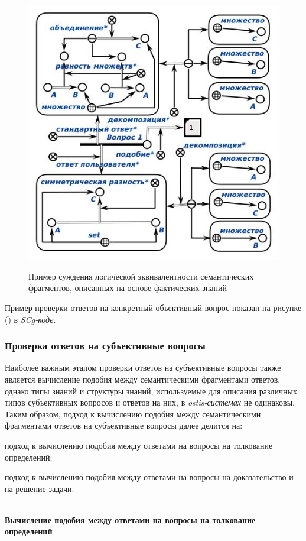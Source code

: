 \begin{figure}[H]
	\caption{Пример суждения логической эквивалентности семантических фрагментов, описанных на основе фактических знаний}
	\includegraphics[scale=0.7]{author/part7/figures/logical_equivalence_example.jpg}
	\label{fig:LE_example}
\end{figure}

Пример проверки ответов на конкретный объективный вопрос показан на рисунке (\textit{}) в \textit{SCg-коде}.

\subsubsection{Проверка ответов на субъективные вопросы}
\label{subsubsec_checking_answers_subjective_questions}

Наиболее важным этапом проверки ответов на субъективные вопросы также является вычисление подобия между семантическими фрагментами ответов, однако типы знаний и структуры знаний, используемые для описания различных типов субъективных вопросов и ответов на них, в \textit{ostis-системах} не одинаковы. Таким образом, подход к вычислению подобия между семантическими фрагментами ответов на субъективные вопросы далее делится на:

\begin{textitemize}
	\item подход к вычислению подобия между ответами на вопросы на толкование определений;
	\item подход к вычислению подобия между ответами на вопросы на доказательство и на решение задачи.
\end{textitemize} 
~\\
\textbf{Вычисление подобия между ответами на вопросы на толкование определений} 

